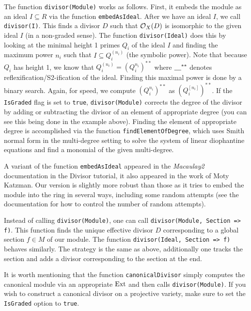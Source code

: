 \documentclass[11pt]{amsart}
\begin{document}
The function {\tt divisor(Module)} works as follows.  First, it embeds the module as an ideal $I \subseteq R$ via the function {\tt embedAsIdeal}.  After we have an ideal $I$, we call {\tt divisor(I)}.  This finds a divisor $D$ such that $\mbox{$\mathcal{O}$}_X(D)$ is isomorphic to the given ideal $I$ (in a non-graded sense).  The function {\tt divisor(Ideal)} does this by looking at the minimal height 1 primes $Q_i$ of the ideal $I$ and finding the maximum power $n_i$ such that $I \subseteq Q_i^{(n_i)}$ (the symbolic power).  Note that because $Q_i$ has height 1, we know that $Q_i^{(n_i)} = (Q_i^{n_i})^{**}$ where $\underline{\hskip 10pt}^{**}$ denotes reflexification/S2-ification of the ideal.  Finding this maximal power is done by a binary search.  Again, for speed, we compute $(Q_i^{n_i})^{**}$ as $(Q_i^{[n_i]})^{**}$.  If the {\tt IsGraded} flag is set to {\tt true}, {\tt divisor(Module)} corrects the degree of the divisor by adding or subtracting the divisor of an element of appropriate degree (you can see this being done in the example above).  Finding the element of appropriate degree is accomplished via the function {\tt findElementOfDegree}, which uses Smith normal form in the multi-degree setting to solve the system of linear diophantine equations and find a monomial of the given multi-degree.

\begin{remark}
A variant of the function {\tt embedAsIdeal} appeared in the \emph{Macaulay2} documentation in the Divisor tutorial, it also appeared in the work of Moty Katzman.  Our version is slightly more robust than those as it tries to embed the module into the ring in several ways, including some random attempts (see the documentation for how to control the number of random attempts).
\end{remark}

Instead of calling {\tt divisor(Module)}, one can call {\tt divisor(Module, Section => f)}.  This function finds the unique effective divisor $D$ corresponding to a global section $f \in M$ of our module.  The function {\tt divisor(Ideal, Section => f)} behaves similarly.  The strategy is the same as above, additionally one tracks the section and adds a divisor corresponding to the section at the end.

It is worth mentioning that the function {\tt canonicalDivisor} simply computes the canonical module via an appropriate $\operatorname{Ext}$ and then calls {\tt divisor(Module)}.  If you wish to construct a canonical divisor on a projective variety, make sure to set the {\tt IsGraded} option to {\tt true}.
\end{document}
